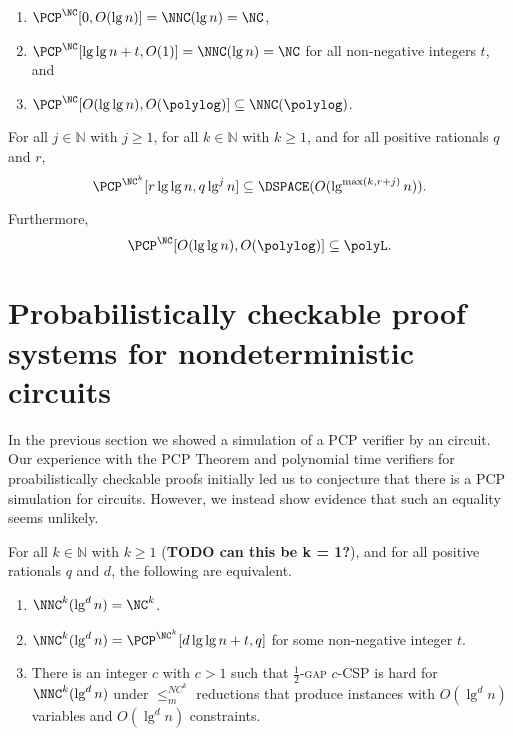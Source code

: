\documentclass[]{article}
\begin{document}
\begin{corollary}\label{cor:pcpinnnc}
  \mbox{}
  \begin{enumerate}
  \item $\PCP^{\NC}[0, O(\lg n)] = \NNC(\lg n) = \NC$,
  \item $\PCP^{\NC}[\lg \lg n + t, O(1)] = \NNC(\lg n) = \NC$ for all non-negative integers $t$, and
  \item $\PCP^{\NC}[O(\lg \lg n), O(\polylog)] \subseteq \NNC(\polylog)$.
  \end{enumerate}
\end{corollary}

\begin{corollary}
  For all $j \in \mathbb{N}$ with $j \geq 1$, for all $k \in \mathbb{N}$ with $k \geq 1$, and for all positive rationals $q$ and $r$,
  \begin{equation*}
    \PCP^{\NC^k}[r \lg \lg n, q \lg^j n] \subseteq \DSPACE(O(\lg^{\max(k, r + j)} n)).
  \end{equation*}

  Furthermore,
  \begin{equation*}
    \PCP^{\NC}[O(\lg \lg n), O(\polylog)] \subseteq \polyL.
  \end{equation*}
\end{corollary}

\section{Probabilistically checkable proof systems for nondeterministic \texorpdfstring{\NC}{NC} circuits}\label{sec:pcpinnnc}

In the previous section we showed a simulation of a PCP verifier by an \NNC{} circuit.
Our experience with the PCP Theorem and polynomial time verifiers for proabilistically checkable proofs initially led us to conjecture that there is a PCP simulation for \NNC{} circuits.
However, we instead show evidence that such an equality seems unlikely.

\begin{theorem}\label{thm:equiv}
  For all $k \in \mathbb{N}$ with $k \geq 1$ (\textbf{TODO can this be k = 1?}), and for all positive rationals $q$ and $d$, the following are equivalent.
  \begin{enumerate}
  \item $\NNC^k(\lg^d n) = \NC^k$.
  \item $\NNC^k(\lg^d n) = \PCP^{\NC^k}[d \lg \lg n + t, q]$ for some non-negative integer $t$.
  \item There is an integer $c$ with $c > 1$ such that \textsc{$\frac{1}{2}$-gap $c$-CSP} is hard for $\NNC^k(\lg^d n)$ under $\leq_m^{NC^k}$ reductions that produce instances with $O(\lg^d n)$ variables and $O(\lg^d n)$ constraints.
  \end{enumerate}
\end{theorem}
\end{document}
